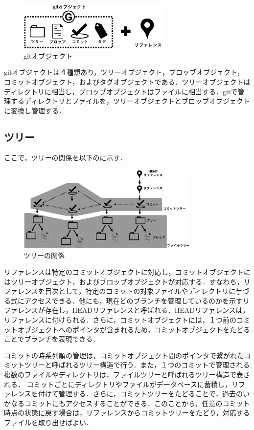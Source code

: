 \documentclass[a4j,9pt,twocolumn]{jsarticle}
\begin{document}
\begin{figure}[h]
\centering
\includegraphics[width=75mm]{img/git_obj2.eps}
\caption{gitオブジェクト}
\label{object2}
\end{figure}

gitオブジェクトは４種類あり，ツリーオブジェクト，ブロッブオブジェクト，コミットオブジェクト，およびタグオブジェクトである．ツリーオブジェクトはディレクトリに相当し，ブロッブオブジェクトはファイルに相当する．gitで管理するディレクトリとファイルを，ツリーオブジェクトとブロッブオブジェクトに変換し管理する．

\subsection{ツリー}
ここで，ツリーの関係を以下のに示す．

\begin{figure}[h]
\centering
\includegraphics[width=90mm]{img/tree.eps}
\caption{ツリーの関係}
\label{tree}
\end{figure}

リファレンスは特定のコミットオブジェクトに対応し，コミットオブジェクトにはツリーオブジェクト，およびブロッブオブジェクトが対応する．すなわち，リファレンスを目次として，特定のコミットの対象ファイルやディレクトリに芋づる式にアクセスできる．他にも，現在どのブランチを管理しているのかを示すリファレンスが存在し，HEADリファレンスと呼ばれる．HEADリファレンスは，リファレンスに付けられる．さらに，コミットオブジェクトには，１つ前のコミットオブジェクトへのポインタが含まれるため，コミットオブジェクトをたどることでブランチを表現できる．

コミットの時系列順の管理は，コミットオブジェクト間のポインタで繋がれたコミットツリーと呼ばれるツリー構造で行う．また，１つのコミットで管理される複数のファイルやディレクトリは，ファイルツリーと呼ばれるツリー構造で表される．
コミットごとにディレクトリやファイルがデータベースに蓄積し，リファレンスを付けて管理する．さらに，コミットツリーをたどることで，過去のいかなるコミットにもアクセスすることができる．このことから，任意のコミット時点の状態に戻す場合は，リファレンスからコミットツリーをたどり，対応するファイルを取り出せばよい．
\end{document}
